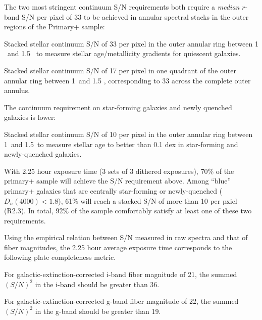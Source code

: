 \documentclass[11pt,a4paper,twoside,onecolumn,openany,final,oldfontcommands]{memoir}
\begin{document}
The two most stringent continuum S/N requirements both require a {\em median} $r$-band S/N per pixel of 33 to be achieved in annular spectral stacks in the outer regions of the Primary+ sample:

\begin{requirement}

\reqitem Stacked stellar continuum S/N of 33 per pixel in the outer annular ring between 1 \Reff\ and 1.5 \Reff\ to measure stellar age/metallicity gradients for quiescent galaxies.
    
\reqitem Stacked stellar continuum S/N of 17 per pixel in one quadrant of the outer annular ring between 1\Reff\ and 1.5 \Reff, corresponding to 33 across the complete outer annulus.

\end{requirement}

\noindent The continuum requirement on star-forming galaxies and newly quenched galaxies is lower: 

\begin{requirement}

\reqitem Stacked stellar continuum S/N of 10 per pixel in the outer annular ring between 1\Reff\ and 1.5\Reff\ to measure stellar age to better than 0.1 dex in star-forming and newly-quenched galaxies. 

\end{requirement}

With 2.25 hour exposure time (3 sets of 3 dithered exposures), 70\% of the primary+ sample will achieve the S/N requirement above. Among ``blue'' primary+ galaxies that are centrally star-forming or newly-quenched ($D_n(4000) < 1.8$), 61\% will reach a stacked S/N of more than 10 per pxiel (R2.3).  In total, 92\% of the sample comfortably satisfy at least one of these two requirements.

Using the empirical relation between S/N measured in raw spectra and that of fiber magnitudes, the 2.25 hour average exposure time corresponds to the following plate completeness metric. 


\begin{requirement}

\reqitem For galactic-extinction-corrected i-band fiber magnitude of 21, the summed $(S/N)^2$ in the i-band should be greater than 36.
    
\reqitem For galactic-extinction-corrected g-band fiber magnitude of 22, the summed $(S/N)^2$ in the g-band should be greater than 19.

\end{requirement}
\end{document}
